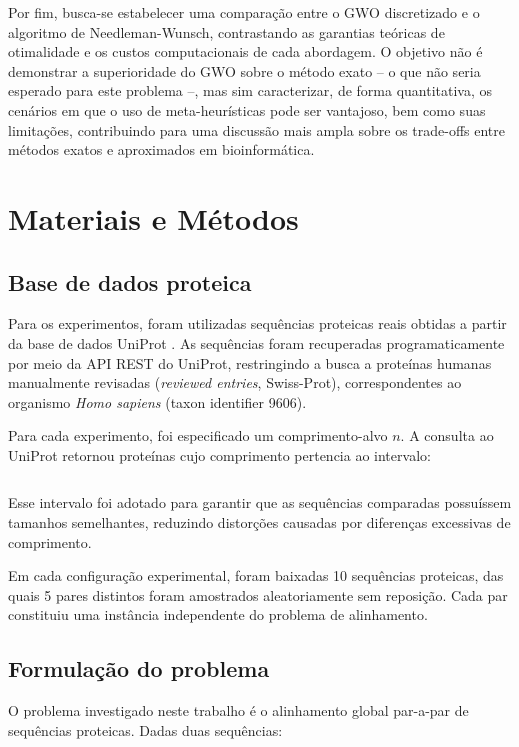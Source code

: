 \documentclass[12pt]{article}
\begin{document}
Por fim, busca-se estabelecer uma comparação entre o GWO discretizado e o algoritmo de Needleman-Wunsch, contrastando
as garantias teóricas de otimalidade e os custos computacionais de cada abordagem. O objetivo não é demonstrar a
superioridade do GWO sobre o método exato -- o que não seria esperado para este problema --, mas sim caracterizar, de
forma quantitativa, os cenários em que o uso de meta-heurísticas pode ser vantajoso, bem como suas limitações,
contribuindo para uma discussão mais ampla sobre os trade-offs entre métodos exatos e aproximados em bioinformática.

\section{Materiais e Métodos}

\subsection{Base de dados proteica}

Para os experimentos, foram utilizadas sequências proteicas reais obtidas a partir da base de dados UniProt \cite{uniprot}. As sequências foram recuperadas programaticamente por meio da API REST do UniProt, restringindo a busca a proteínas humanas manualmente revisadas (\textit{reviewed entries}, Swiss-Prot), correspondentes ao organismo \textit{Homo sapiens} (taxon identifier 9606).

Para cada experimento, foi especificado um comprimento-alvo $n$. A consulta ao UniProt retornou proteínas cujo comprimento pertencia ao intervalo:

\begin{equation}
    [n - 10, n + 10]
\end{equation}

Esse intervalo foi adotado para garantir que as sequências comparadas possuíssem tamanhos semelhantes, reduzindo distorções causadas por diferenças excessivas de comprimento.

Em cada configuração experimental, foram baixadas 10 sequências proteicas, das quais 5 pares distintos foram amostrados aleatoriamente sem reposição. Cada par constituiu uma instância independente do problema de alinhamento.

\subsection{Formulação do problema}

O problema investigado neste trabalho é o alinhamento global par-a-par de sequências proteicas. Dadas duas sequências:
\end{document}
